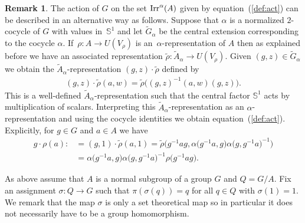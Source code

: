 \documentclass[10pt,a4paper]{amsart}
\def\S{\mathbb{S}}
\DeclareMathOperator{\Irr}{\textup{Irr}}
\theoremstyle{definition}
\newtheorem{Rem}[Th]{Remark}
\numberwithin{equation}{section}
\begin{document}
\begin{Rem}The action of $G$ on the set $\Irr^{\alpha}(A)$ given by equation~(\ref{def:act}) can be
described in an alternative way as follows. Suppose that $\alpha$ is a normalized $2$-cocycle of
$G$ with values in~$\S^{1}$ and let $\widetilde{G}_{\alpha}$ be the central extension corresponding
to the cocycle $\alpha$. If~$\rho\colon A\rightarrow U(V_{\rho})$ is an~$\alpha$-representation of $A$
then as explained before we have an associated representation \mbox{$\tilde{\rho}\colon \tilde{A}_{\alpha}\to U(V_{\rho})$}.
Given $(g,z)\in \widetilde{G}_{\alpha}$ we obtain the $\tilde{A}_{\alpha}$-representation
$(g,z)\cdot \tilde{\rho}$ defined by
\begin{gather*}
(g,z)\cdot \tilde{\rho}(a,w)=\tilde{\rho}\big((g,z)^{-1}(a,w)(g,z)\big).
\end{gather*}
This is a well-defined $\tilde{A}_{\alpha}$-representation such that the central factor
$\S^{1}$ acts by multiplication of scalars. Interpreting this $\tilde{A}_{\alpha}$-representation as an
$\alpha$-representation and using the cocycle identities we obtain equation~(\ref{def:act}). Explicitly,
for $g\in G$ and $a\in A$ we have
\begin{align*}
g\cdot \rho(a):\!&=(g,1)\cdot \tilde{\rho}(a,1)= \tilde{\rho}\big(g^{-1}ag,\alpha\big(g^{-1}a,g\big)\alpha\big(g,g^{-1}a\big)^{-1}\big)
\\
&=\alpha\big(g^{-1}a,g\big)\alpha\big(g,g^{-1}a\big)^{-1} \rho\big(g^{-1}ag\big).
\end{align*}
\end{Rem}


As above assume that $A$ is a normal subgroup of a group $G$ and $Q=G/A$. Fix an assignment
$\sigma \colon Q \rightarrow G$ such that $\pi(\sigma(q)) = q$ for all $q \in Q$ with $\sigma(1)
= 1$. We remark that the map $\sigma$ is only a set theoretical map so in particular it does
not necessarily have to be a group homomorphism.
\end{document}
